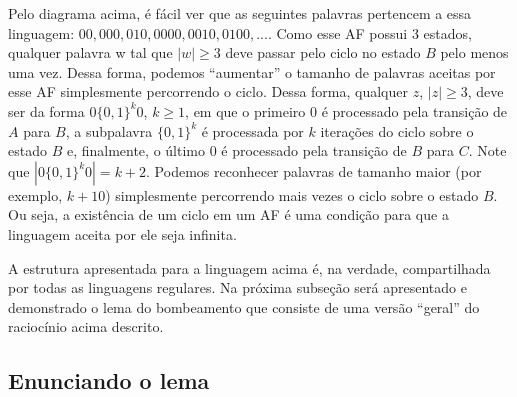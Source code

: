 \documentclass[a4paper]{article}
\theoremstyle{definition}
\begin{document}
  \begin{figure}[H]
    \centering
  \end{figure}

  Pelo diagrama acima, é fácil ver que as seguintes palavras pertencem a essa
  linguagem: $00, 000, 010, 0000, 0010,0100,...$. Como esse AF possui 3 estados,
  qualquer palavra w tal que $|w| \geq 3$ deve passar pelo ciclo no estado $B$
  pelo menos uma vez. Dessa forma, podemos ``aumentar'' o tamanho de palavras
  aceitas por esse AF simplesmente percorrendo o ciclo. Dessa forma, 
  qualquer $z$, $|z| \geq 3$, deve ser da forma $0\{0,1\}^k0$, $k\geq 1$,
  em que o primeiro $0$ é processado pela transição de $A$ para $B$,
  a subpalavra $\{0,1\}^k$ é processada por $k$ iterações do ciclo
  sobre o estado $B$ e, finalmente, o último $0$ é processado pela
  transição de $B$ para $C$. Note que $|0\{0,1\}^k0| = k + 2$.
  Podemos reconhecer palavras de tamanho maior (por exemplo, $k + 10$)
  simplesmente percorrendo mais vezes o ciclo sobre o estado $B$. Ou seja,
  a existência de um ciclo em um AF é uma condição para que a linguagem
  aceita por ele seja infinita.

  A estrutura apresentada para a linguagem acima é, na verdade, compartilhada
  por todas as linguagens regulares. Na próxima subseção será apresentado e
  demonstrado o lema do bombeamento que consiste de uma versão ``geral''
  do raciocínio acima descrito.

  \subsection{Enunciando o lema}
\end{document}
